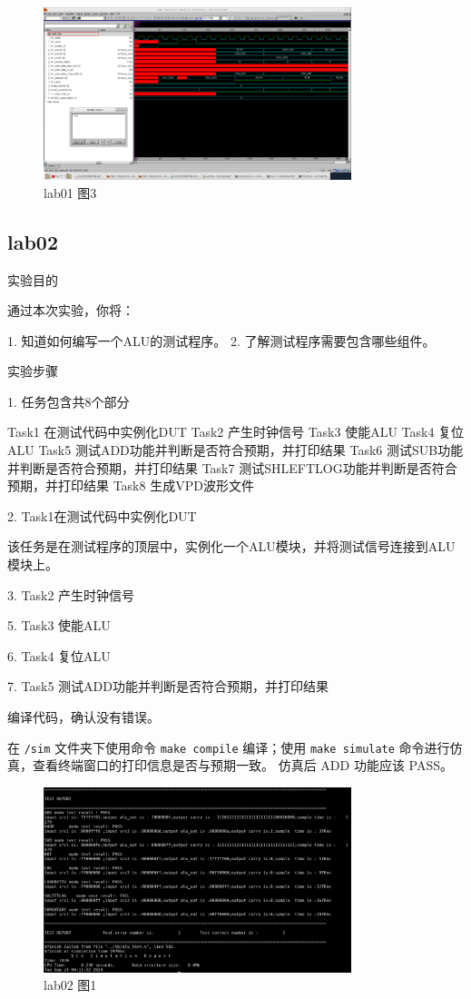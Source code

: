 \begin{figure}[H]
    \centering
    \includegraphics[width=0.8\textwidth]{images/lab01-03.png}
    \caption{lab01 图3}
\end{figure}

\subsection{lab02}

实验目的

通过本次实验，你将：

1. 知道如何编写一个ALU的测试程序。
2. 了解测试程序需要包含哪些组件。

实验步骤

1.	 任务包含共8个部分

Task1  在测试代码中实例化DUT
Task2  产生时钟信号
Task3  使能ALU
Task4  复位ALU
Task5  测试ADD功能并判断是否符合预期，并打印结果
Task6  测试SUB功能并判断是否符合预期，并打印结果 
Task7  测试SHLEFTLOG功能并判断是否符合预期，并打印结果
Task8  生成VPD波形文件

2. Task1在测试代码中实例化DUT

该任务是在测试程序的顶层中，实例化一个ALU模块，并将测试信号连接到ALU模块上。

3. Task2  产生时钟信号

5. Task3  使能ALU

6. Task4  复位ALU

7. Task5  测试ADD功能并判断是否符合预期，并打印结果

编译代码，确认没有错误。

在 \texttt{/sim} 文件夹下使用命令 \texttt{make compile} 编译；使用 \texttt{make simulate} 命令进行仿真，查看终端窗口的打印信息是否与预期一致。 仿真后 ADD 功能应该 PASS。

\begin{figure}[H]
    \centering
    \includegraphics[width=0.8\textwidth]{images/lab02-01.png}
    \caption{lab02 图1}
\end{figure}

